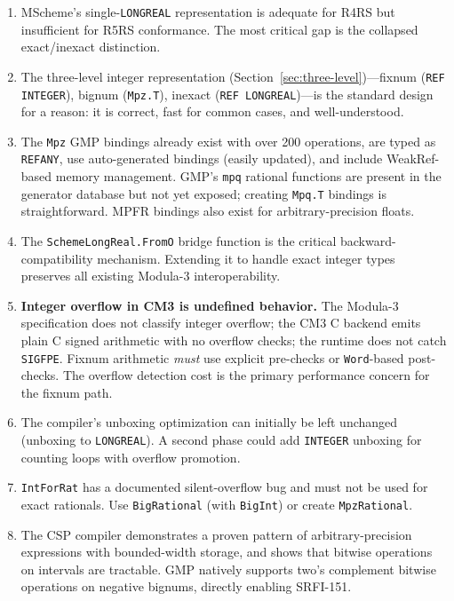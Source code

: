 \documentclass[12pt]{report}
\begin{document}
\begin{enumerate}
\item MScheme's single-{\tt LONGREAL} representation is adequate for
  R4RS but insufficient for R5RS conformance.  The most critical gap
  is the collapsed exact/inexact distinction.

\item The three-level integer representation (Section~\ref{sec:three-level})---fixnum
  ({\tt REF INTEGER}), bignum ({\tt Mpz.T}), inexact ({\tt REF
  LONGREAL})---is the standard design for a reason: it is correct,
  fast for common cases, and well-understood.

\item The {\tt Mpz} GMP bindings already exist with over 200
  operations, are typed as {\tt REFANY}, use auto-generated
  bindings (easily updated), and include WeakRef-based memory
  management.  GMP's {\tt mpq} rational functions are present in
  the generator database but not yet exposed; creating {\tt Mpq.T}
  bindings is straightforward.  MPFR bindings also exist for
  arbitrary-precision floats.

\item The {\tt SchemeLongReal.FromO} bridge function is the
  critical backward-compatibility mechanism.  Extending it to
  handle exact integer types preserves all existing Modula-3
  interoperability.

\item \textbf{Integer overflow in CM3 is undefined behavior.}
  The Modula-3 specification does not classify integer overflow;
  the CM3 C backend emits plain C signed arithmetic with no overflow
  checks; the runtime does not catch {\tt SIGFPE}.  Fixnum arithmetic
  \emph{must} use explicit pre-checks or {\tt Word}-based post-checks.
  The overflow detection cost is the primary performance concern for
  the fixnum path.

\item The compiler's unboxing optimization can initially be left
  unchanged (unboxing to {\tt LONGREAL}).  A second phase could
  add {\tt INTEGER} unboxing for counting loops with overflow
  promotion.

\item {\tt IntForRat} has a documented silent-overflow bug and
  must not be used for exact rationals.  Use {\tt BigRational}
  (with {\tt BigInt}) or create {\tt MpzRational}.

\item The CSP compiler demonstrates a proven pattern of
  arbitrary-precision expressions with bounded-width storage, and
  shows that bitwise operations on intervals are tractable.
  GMP natively supports two's complement bitwise operations on
  negative bignums, directly enabling SRFI-151.
\end{enumerate}
\end{document}
